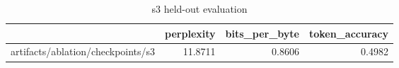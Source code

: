 \begin{table}[t]
\centering
\begin{tabular}{lrrr}
\toprule
 & perplexity & bits\_per\_byte & token\_accuracy \\
\midrule
artifacts/ablation/checkpoints/s3 & 11.8711 & 0.8606 & 0.4982 \\
\bottomrule
\end{tabular}
\caption{s3 held-out evaluation}
\label{tab:s3-eval}
\end{table}
